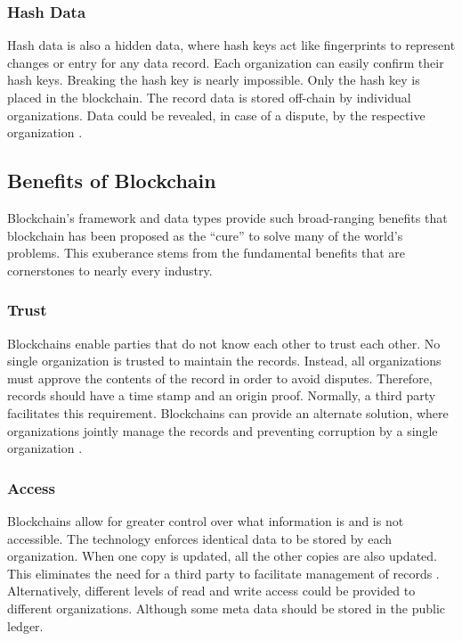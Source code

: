 \documentclass[sigconf]{acmart}
\begin{document}
\subsubsection{Hash Data} Hash data is also a hidden data, where hash keys act like fingerprints to represent changes or entry for any data record. Each organization can easily confirm their hash keys. Breaking the hash key is nearly impossible. Only the hash key is placed in the blockchain. The record data is stored off-chain by individual organizations. Data could be revealed, in case of a dispute, by the respective organization \cite{arbc1}.

\subsection{Benefits of Blockchain}
Blockchain's framework and data types provide such broad-ranging benefits that blockchain has been proposed as the ``cure'' to solve many of the world's problems. This exuberance stems from the fundamental benefits that are cornerstones to nearly every industry.

\subsubsection{Trust} Blockchains enable parties that do not know each other to trust each other. No single organization is trusted to maintain the records. Instead, all organizations must approve the contents of the record in order to avoid disputes. Therefore, records should have a time stamp and an origin proof. Normally, a third party facilitates this requirement. Blockchains can provide an alternate solution, where organizations jointly manage the records and preventing corruption by a single organization \cite{arbc1}. 

\subsubsection{Access} Blockchains allow for greater control over what information is and is not accessible. The technology enforces identical data to be stored by each organization. When one copy is updated, all the other copies are also updated. This eliminates the need for a third party to facilitate management of records \cite{arbc3}. Alternatively, different levels of read and write access could be provided to different organizations. Although some meta data should be stored in the public ledger. 
\end{document}
